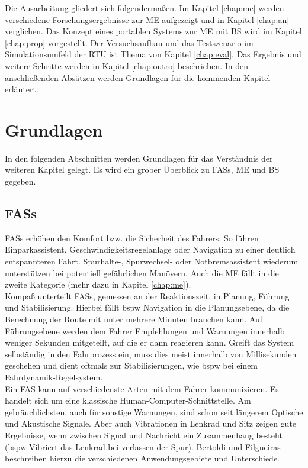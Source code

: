 {Die Ausarbeitung gliedert sich folgendermaßen. Im Kapitel \ref{chap:me} werden verschiedene Forschungsergebnisse zur \acl{ME} aufgezeigt und in Kapitel \ref{chap:an} verglichen. Das Konzept eines portablen Systems zur \acl{ME} mit \acl{BS} wird im Kapitel \ref{chap:prop} vorgestellt. Der Versuchsaufbau und das Testszenario im Simulationsumfeld der \acl{RTU} ist Thema von Kapitel \ref{chap:eval}. Das Ergebnis und weitere Schritte werden in Kapitel \ref{chap:outro} beschrieben. In den anschließenden Absätzen werden Grundlagen für die kommenden Kapitel erläutert.

\section{Grundlagen}
In den folgenden Abschnitten werden Grundlagen für das Verständnis der weiteren Kapitel gelegt. Es wird ein grober Überblick zu \acl{FASs}, \acl{ME} und \acl{BS} gegeben.

\subsection{\acl{FASs}}
\acl{FASs} erhöhen den Komfort bzw. die Sicherheit des Fahrers. So führen Einparkassistent, Geschwindigkeitsregelanlage oder Navigation zu einer deutlich entspannteren Fahrt. Spurhalte-, Spurwechsel- oder Notbremsassistent wiederum unterstützen bei potentiell gefährlichen Manövern. Auch die \acl{ME} fällt in die zweite Kategorie (mehr dazu in Kapitel \ref{chap:me}).\\

Kompaß \cite{fasFuture} unterteilt \acl{FASs}, gemessen an der Reaktionszeit, in Planung, Führung und Stabilisierung. Hierbei fällt \acl{bspw} Navigation in die Planungsebene, da die Berechnung der Route mit unter mehrere Minuten brauchen kann. Auf Führungsebene werden dem Fahrer Empfehlungen und Warnungen innerhalb weniger Sekunden mitgeteilt, auf die er dann reagieren kann. Greift das System selbständig in den Fahrprozess ein, muss dies meist innerhalb von Millisekunden geschehen und dient oftmals zur Stabilisierungen, wie \acl{bspw} bei einem Fahrdynamik-Regelsystem.\\

Ein \acl{FAS} kann auf verschiedenste Arten mit dem Fahrer kommunizieren. Es handelt sich um eine klassische Human-Computer-Schnittstelle. Am gebräuchlichsten, auch für sonstige Warnungen, sind schon seit längerem Optische und Akustische Signale. Aber auch Vibrationen in Lenkrad und Sitz zeigen gute Ergebnisse, wenn zwischen Signal und Nachricht ein Zusammenhang besteht (\acl{bspw} Vibriert das Lenkrad bei verlassen der Spur). Bertoldi und Filgueiras \cite{Bertoldi:2010:MAD:2002368.2002370} beschreiben hierzu die verschiedenen Anwendungsgebiete und Unterschiede. \\

}
